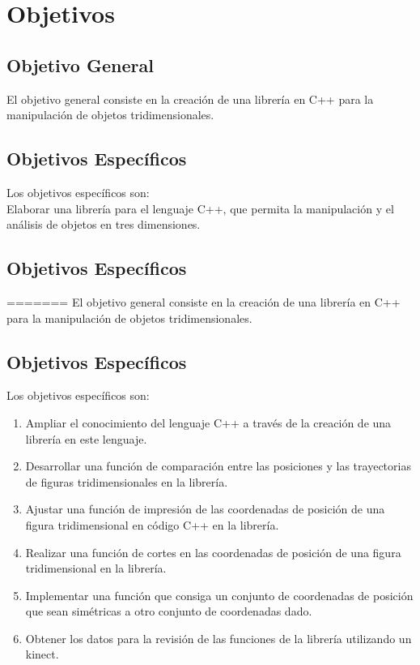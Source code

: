 \documentclass[letterpaper]{article}
\begin{document}
\section{Objetivos}

\subsection{Objetivo General}


El objetivo general consiste en la creación de una librería en C++ para la manipulación de objetos tridimensionales.\\

\subsection{Objetivos Específicos}
Los objetivos específicos son:\\

Elaborar una librería para el lenguaje C++, que permita la manipulación y el análisis de objetos en tres dimensiones.\\

\subsection{Objetivos Específicos}
=======
El objetivo general consiste en la creación de una librería en C++ para la manipulación de objetos tridimensionales.\\

\subsection{Objetivos Específicos}

Los objetivos específicos son:\\

\begin{enumerate}
\item Ampliar el conocimiento del lenguaje C++ a través de la creación de una librería en este lenguaje. 
\item Desarrollar una función de comparación entre las posiciones y las trayectorias de figuras tridimensionales en la librería.
\item Ajustar una función de impresión de las coordenadas de posición de una figura tridimensional en código C++ en la librería. 
\item Realizar una función de cortes en las coordenadas de posición de una figura tridimensional en la librería.
\item Implementar una función que consiga un conjunto de coordenadas de posición que sean simétricas a otro conjunto de coordenadas dado.
\item Obtener los datos para la revisión de las funciones de la librería utilizando un kinect.
\end{enumerate}
\end{document}
